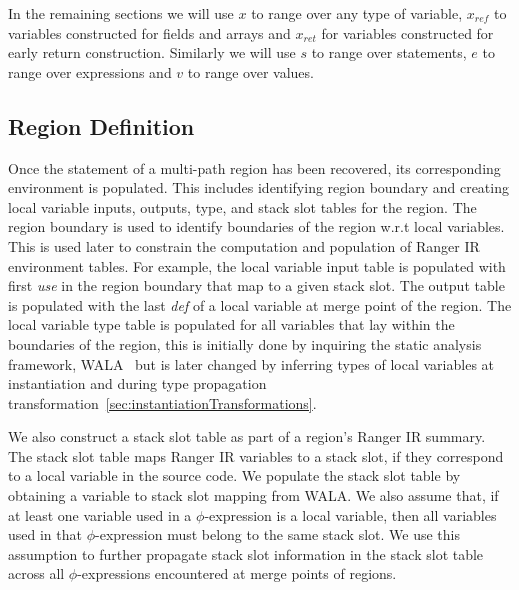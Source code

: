 In the remaining sections we will use $x$ to range over any type of variable, $x_{ref}$ to variables constructed for fields and arrays and $x_{ret}$ for variables constructed for early return construction. Similarly we will use $s$ to range over statements, $e$ to range over expressions and $v$ to range over values.

\subsection{Region Definition}

Once the statement of a multi-path region has been recovered, its corresponding environment is populated.
%
This includes identifying region boundary and creating local variable inputs, outputs, type, and stack slot tables for
the region.
%
The region boundary is used to identify boundaries of the region w.r.t local variables.
%
This is used later to constrain the computation and population of Ranger IR environment tables.
%
For example, the local variable input table is populated with first \textit{use} in the region boundary that map to a given stack slot.
%
The output table is populated with the last \textit{def} of a local variable at merge point of the region.
%
The local variable type table is populated for all variables that lay within the boundaries of the region, this is initially done by
inquiring the static analysis framework, WALA~\cite{Wala} but is later changed by inferring types of local variables
at instantiation and during type propagation transformation~\ref{sec:instantiationTransformations}.

We also construct a stack slot table as part of a region\rq s Ranger IR summary.
%
The stack slot table maps Ranger IR variables to a stack slot, if they correspond to a local variable in the source code.
%
We populate the stack slot table by obtaining a variable to stack slot mapping from WALA.
%
We also assume that, if at least one variable used in a $\phi$-expression is a local variable, then all variables
used in that $\phi$-expression must belong to the same stack slot.
%
We use this assumption to further propagate stack slot information in the stack slot table across all $\phi$-expressions
encountered at merge points of regions.


